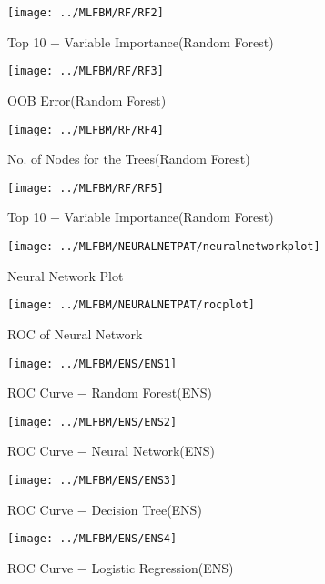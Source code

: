 \documentclass[12pt, a4paper, bibliography=totoc, english]{scrartcl}
\begin{document}
\begin{figure}
	\centering
	\texttt{[image: ../MLFBM/RF/RF2]}
	\caption{Top 10 − Variable Importance(Random Forest)}
	\label{fig:rf2}
\end{figure}

\begin{figure}
	\centering
	\texttt{[image: ../MLFBM/RF/RF3]}
	\caption{OOB Error(Random Forest)}
	\label{fig:rf3}
\end{figure}

\begin{figure}
	\centering
	\texttt{[image: ../MLFBM/RF/RF4]}
	\caption{No. of Nodes for the Trees(Random Forest)}
	\label{fig:rf4}
\end{figure}

\begin{figure}
	\centering
	\texttt{[image: ../MLFBM/RF/RF5]}
	\caption{Top 10 − Variable Importance(Random Forest)}
	\label{fig:rf5}
\end{figure}



\begin{figure}
	\centering
	\texttt{[image: ../MLFBM/NEURALNETPAT/neuralnetworkplot]}
	\caption{Neural Network Plot}
	\label{fig:neuralnetworkplot}
\end{figure}

\begin{figure}
	\centering
	\texttt{[image: ../MLFBM/NEURALNETPAT/rocplot]}
	\caption{ROC of Neural Network}
	\label{fig:rocplot}
\end{figure}

\begin{figure}
	\centering
	\texttt{[image: ../MLFBM/ENS/ENS1]}
	\caption{ROC Curve − Random Forest(ENS)}
	\label{fig:ens1}
\end{figure}
\begin{figure}
	\centering
	\texttt{[image: ../MLFBM/ENS/ENS2]}
	\caption{ROC Curve − Neural Network(ENS)}
	\label{fig:ens2}
\end{figure}

\begin{figure}
	\centering
	\texttt{[image: ../MLFBM/ENS/ENS3]}
	\caption{ROC Curve − Decision Tree(ENS)}
	\label{fig:ens3}
\end{figure}
\begin{figure}
	\centering
	\texttt{[image: ../MLFBM/ENS/ENS4]}
	\caption{ROC Curve − Logistic Regression(ENS)}
	\label{fig:ens4}
\end{figure}
\end{document}
